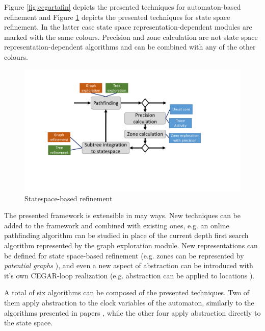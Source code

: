 Figure \ref{fig:cegartafin} depicts the presented techniques for automaton-based refinement and Figure \ref{fig:cegarsspfin} depicts the presented techniques for state space refinement. In the latter case state space representation-dependent modules are marked with the same colours. Precision and zone calculation are not state space representation-dependent algorithms and can be combined with any of the other colours.

\begin{figure}[h]
	\centering
	\includegraphics[width=.9\textwidth]{include/figures/cegar_ssp_complete}
	\caption{Statespace-based refinement}
	\label{fig:cegarsspfin}
\end{figure}

The presented framework is extensible in may ways. New techniques can be added to the framework and combined with existing ones, e.g. an online pathfinding algorithm can be studied in place of the current depth first search algorithm represented by the graph exploration module. New representations can be defined for state space-based refinement (e.g. zones can be represented by \emph{potential graphs} \cite{conf/sas/GangeNSSS16}), and even a new aspect of abstraction can be introduced with it's own CEGAR-loop realization (e.g. abstraction can be applied to locations \cite{kemper2007sat}).

A total of six algorithms can be composed of the presented techniques. Two of them apply abstraction to the clock variables of the automaton, similarly to the algorithms presented in papers \cite{dierks2007automatic, he2010compositional,okano2011clock}, while the other four apply abstraction directly to the state space. 



